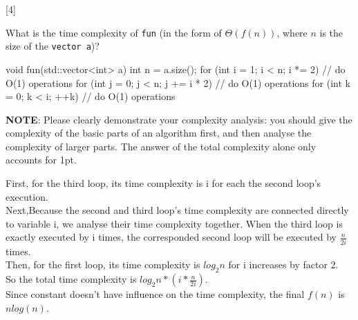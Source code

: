 [4]

What is the time complexity of \lstinline{fun} (in the form of \(\Theta(f(n))\), where \(n\) is the size of the \lstinline{vector a})?

\begin{cpp}
void fun(std::vector<int> a) {
    int n = a.size();
    for (int i = 1; i < n; i *= 2) {
        // do O(1) operations
        for (int j = 0; j < n; j += i * 2) {
            // do O(1) operations
            for (int k = 0; k < i; ++k) {
                // do O(1) operations
            }
        }
    }
}
\end{cpp}

\textbf{NOTE}: Please clearly demonstrate your complexity analysis: you should give the complexity of the basic parts of an algorithm first, and then analyse the complexity of larger parts. The answer of the total complexity alone only accounts for 1pt.

\begin{solution}
    First, for the third loop, its time complexity is i for each the second loop's execution.\\
    Next,Because the second and third loop's time complexity are connected directly to variable i, we analyse their time complexity together. When the third loop is exactly executed by i times, the corresponded second loop will be executed by $\frac{n}{2i}$ times.\\
    Then, for the first loop, its time complexity is $log_{2}n$ for i increases by factor 2.\\    
    So the total time complexity is $log_{2}n * (i * \frac{n}{2i})$.\\
    Since constant doesn't have influence on the time complexity, the final $f(n)$ is\\
    $nlog(n)$. 
\end{solution}
